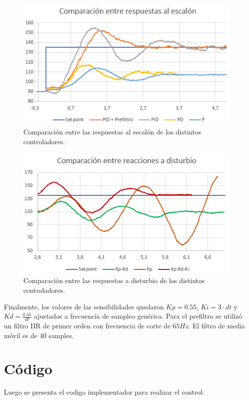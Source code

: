 \begin{figure}[H]
    \centering
    \includegraphics[width=\textwidth]{./Imagenes/comptrans.png}
    \caption{Comparación entre las respuestas al escalón de los distintos controladores.}
    \label{fig:comptrans}
\end{figure}

\begin{figure}[H]
    \centering
    \includegraphics[width=\textwidth]{./Imagenes/compdist.png}
    \caption{Comparación entre las respuestas a disturbio de los distintos controladores.}
    \label{fig:compdist}
\end{figure}

Finalmente, los valores de las sensibilidades quedaron $Kp = 0.55$, $Ki = 3\cdot dt$ y $Kd = \frac{0.45}{dt}$ ajustados a frecuencia de sampleo genérica. Para el prefiltro se utilizó un filtro IIR de primer orden con frecuencia de corte de $65Hz$. El filtro de media móvil es de 40 samples.

\section{Código}
Luego se presenta el codigo implementador para realizar el control:
    

